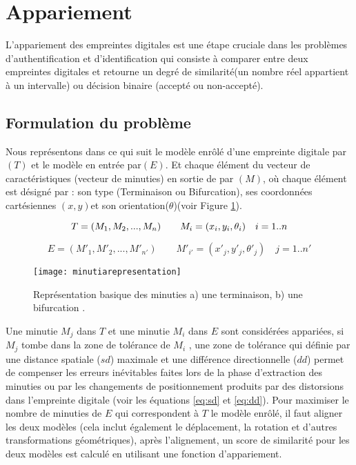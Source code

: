 \section{Appariement}
L'appariement des empreintes digitales est une étape cruciale dans les problèmes d'authentification et d'identification qui consiste à comparer entre deux empreintes digitales et retourne un degré de similarité(un nombre réel appartient à un intervalle) ou décision binaire  (accepté ou non-accepté).
\\
\subsection{Formulation du problème}
Nous représentons dans ce qui suit le modèle enrôlé d'une empreinte digitale par $ (T) $ et le modèle en entrée par$  (E) $. Et chaque élément du vecteur de caractéristiques (vecteur de minuties) en sortie de par $ (M) $, où chaque élément est désigné par : son type (Terminaison ou Bifurcation), ses coordonnées cartésiennes $ (x, y)  $et son orientation($\theta$)(voir Figure \ref{fig:chapitre2minutiarepresentation}). 
\begin{center}
	\begin{equation}\label{eq:t}
	\abovedisplayskip
	\belowdisplayskip
	T=(M_{1},M_{2}, ..., M_{n})\qquad M_{i}=(x_{i},y_{i},\theta_{i})\quad i = 1 .. n
	\end{equation}
\end{center}
\begin{center}
	\begin{equation}\label{eq:e}
	E=(M\prime_{1},M\prime_{2}, ..., M\prime_{n\prime})\qquad M\prime _{i\prime }=(x\prime _{j },y\prime_{j},\theta\prime_{j}) \quad j = 1 .. n\prime
	\end{equation}
\end{center}


\begin{center}
	\begin{figure}[H]
		\centering
		\texttt{[image: minutiarepresentation]}
		\captionsetup{justification=centering}
		\caption{Représentation basique des minuties a) une terminaison, b) une bifurcation \citep{maltoni2009handbook}.}
		\label{fig:chapitre2minutiarepresentation}
	\end{figure}
\end{center}
Une minutie $ M_{j} $ dans $  T $ et une minutie $  M_{i} $ dans $ E $ sont considérées appariées, si $ M_{j} $  tombe dans la zone de tolérance de $ M_{i} $ , une zone de tolérance qui définie par  une distance spatiale ($ sd $) maximale et une différence directionnelle ($ dd $) permet de compenser les erreurs inévitables faites lors de la phase d'extraction des minuties ou par les changements de positionnement produits par des distorsions dans l'empreinte digitale (voir les équations \ref{eq:sd} et \ref{eq:dd}). Pour maximiser le nombre de minuties de $ E $ qui correspondent à $ T $ le modèle enrôlé, il faut aligner les deux modèles (cela inclut également le déplacement, la rotation et d'autres transformations géométriques), après l'alignement, un score de similarité pour les deux modèles est calculé en utilisant une fonction d'appariement.

